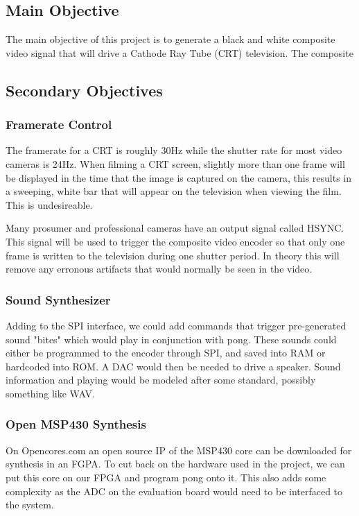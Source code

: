 \subsection*{Main Objective}

The main objective of this project is to generate a black and white composite
video signal that will drive a Cathode Ray Tube (CRT) television. The composite

\subsection*{Secondary Objectives}

\subsubsection*{Framerate Control}

The framerate for a CRT is roughly 30Hz while the shutter rate for most video
cameras is 24Hz. When filming a CRT screen, slightly more than one frame will be
displayed in the time that the image is captured on the camera, this results in
a sweeping, white bar that will appear on the television when viewing the film.
This is undesireable.

Many prosumer and professional cameras have an output signal called HSYNC. This
signal will be used to trigger the composite video encoder so that only one
frame is written to the television during one shutter period. In theory this
will remove any erronous artifacts that would normally be seen in the video.

\subsubsection*{Sound Synthesizer}

Adding to the SPI interface, we could add commands that trigger pre-generated
sound "bites" which would play in conjunction with pong. These sounds could
either be programmed to the encoder through SPI, and saved into RAM or hardcoded
into ROM. A DAC would then be needed to drive a speaker. Sound information and
playing would be modeled after some standard, possibly something like WAV.

\subsubsection*{Open MSP430 Synthesis}

On Opencores.com an open source IP of the MSP430 core can be downloaded for
synthesis in an FGPA. To cut back on the hardware used in the project, we can
put this core on our FPGA and program pong onto it. This also adds some
complexity as the ADC on the evaluation board would need to be interfaced to the
system.

